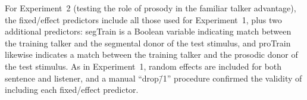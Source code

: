 For Experiment~2 (testing the role of prosody in the familiar talker advantage), the fixed\-/effect predictors include all those used for Experiment~1, plus two additional predictors: {\inlinecode segTrain} is a Boolean variable indicating match between the training talker and the segmental donor of the test stimulus, and {\inlinecode proTrain} likewise indicates a match between the training talker and the prosodic donor of the test stimulus.  As in Experiment~1, random effects are included for both sentence and listener, and a manual “drop\=/1” procedure confirmed the validity of including each fixed\-/effect predictor.

